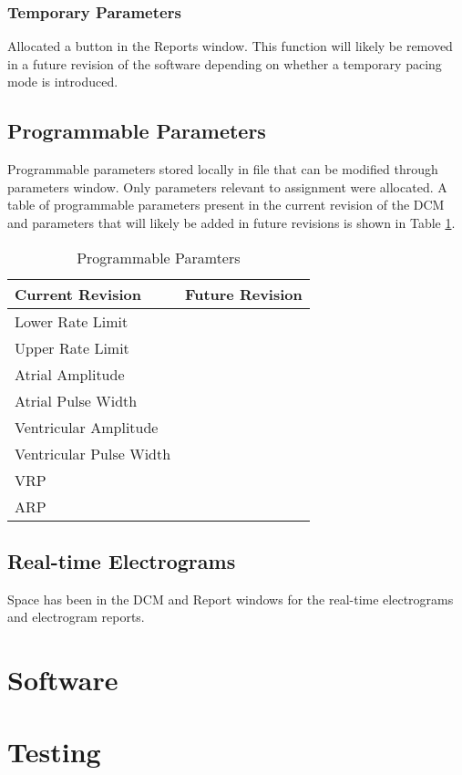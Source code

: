 \documentclass[12pt]{article}
\begin{document}
\subsubsection{Temporary Parameters}
Allocated a button in the Reports window. This function will likely be removed in a future revision of the software depending on whether a temporary pacing mode is introduced.

\subsection{Programmable Parameters}
Programmable parameters stored locally in file that can be modified through parameters window. Only parameters relevant to assignment were allocated. A table of programmable parameters present in the current revision of the DCM and parameters that will likely be added in future revisions is shown in Table \ref{tab:ProgrammableParams}.
\begin{table}[!ht]
\centering
\begin{tabular}{| l | l |} \hline
    Current Revision & Future Revision \\\hline
    Lower Rate Limit & \\
    Upper Rate Limit & \\
    Atrial Amplitude & \\
    Atrial Pulse Width & \\
    Ventricular Amplitude & \\
    Ventricular Pulse Width & \\
    VRP & \\
    ARP & \\\hline
\end{tabular}
\caption{\label{tab:ProgrammableParams}Programmable Paramters}
\end{table}

\subsection{Real-time Electrograms}
Space has been in the DCM and Report windows for the real-time electrograms and electrogram reports.

\newpage
\section{Software}
\subsection{}

\newpage
\section{Testing}
\subsection{}
\end{document}
